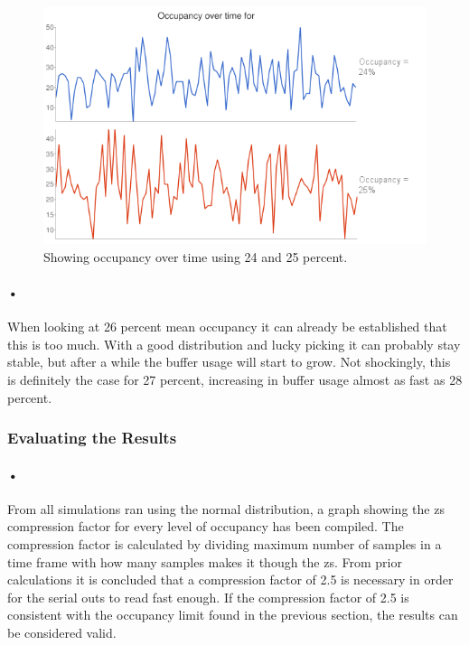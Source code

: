 \documentclass[a4paper, 12pt, openright, twoside]{report}
\begin{document}
\begin{figure}[h!]
	\centering
		\includegraphics[width=1.0\textwidth]{images/occ-over-time.png}
		\caption{Showing occupancy over time using 24 and 25 percent.}
		\label{fig:occ-over-time}
\end{figure}

\paragraph{•}
When looking at 26 percent mean occupancy it can already be established that this is too much.
With a good distribution and lucky picking it can probably stay stable, but after a while the buffer usage will start to grow.
Not shockingly, this is definitely the case for 27 percent, increasing in buffer usage almost as fast as 28 percent.

\subsubsection{Evaluating the Results}

\paragraph{•}
From all simulations ran using the normal distribution, a graph showing the \gls{zs} compression factor for every level of occupancy has been compiled.
The compression factor is calculated by dividing maximum number of samples in a time frame with how many samples makes it though the \gls{zs}.
From prior calculations it is concluded that a compression factor of 2.5 is necessary in order for the serial outs to read fast enough.
If the compression factor of 2.5 is consistent with the occupancy limit found in the previous section, the results can be considered valid.
\end{document}
